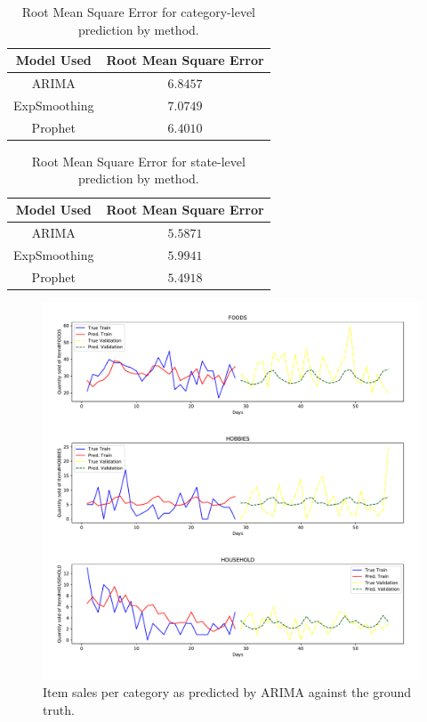 \documentclass[12pt]{article}
\begin{document}
\begin{table}[]
  \centering
  \caption{Root Mean Square Error for category-level prediction by method.}
  \label{tab:rmse-category}
  \begin{tabular}{cc}
  \hline
  Model Used   & Root Mean Square Error \\ \hline
  ARIMA        & $6.8457$               \\
  ExpSmoothing & $7.0749$               \\
  Prophet      & $6.4010$               \\ \hline
  \end{tabular}
\end{table}

\begin{table}[]
    \centering
    \caption{Root Mean Square Error for state-level prediction by method.}
    \label{tab:rmse-state}
    \begin{tabular}{cc}
    \hline
    Model Used   & Root Mean Square Error \\ \hline
    ARIMA        & $5.5871$               \\
    ExpSmoothing & $5.9941$               \\
    Prophet      & $5.4918$               \\ \hline
    \end{tabular}
  \end{table}


\begin{figure}[H]
  \centering
  \includegraphics[width=.8\linewidth]{sarimax-cat}
  \caption{Item sales per category as predicted by ARIMA against the ground truth.}
  \label{fig:arima-category-sales}
\end{figure}
\end{document}
